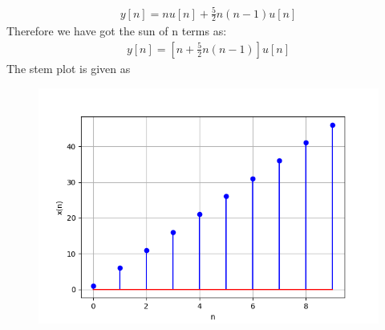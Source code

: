\documentclass[journal,12pt,twocolumn]{IEEEtran}
\theoremstyle{remark}
\begin{document}
\begin{align}
y[n] = n u[n] + \frac{5}{2} n(n-1) u[n]
\end{align}
Therefore we have got the sun of n terms as:
\begin{align}
y[n] = [n  + \frac{5}{2} n(n-1)]u[n]
\end{align}
The stem plot is given as
\begin{figure}[h!]
  \centering
  \includegraphics[width=\columnwidth]{figs/stem.png}
  \label{fig:Stem_Plot}
\end{figure}
\end{document}
